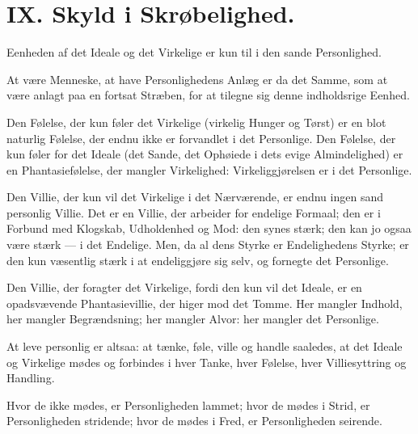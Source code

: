 \documentclass[12pt,a4paper]{book}
\newcommand{\apage}[1]{\marginnote{\footnotesize\textit{[#1]}}}
\begin{document}

\chapter*{IX. Skyld i Skrøbelighed.}
 \apage{93}
\label{ch:forel9}

Eenheden af det Ideale og det Virkelige er kun til i den sande Personlighed.

At være Menneske, at have Personlighedens Anlæg er da det Samme, som at være
anlagt paa en fortsat Stræben, for at tilegne sig denne indholdsrige Eenhed.

Den Følelse, der kun føler det Virkelige (virkelig Hunger og Tørst) er en
blot naturlig Følelse, der endnu ikke er forvandlet i det Personlige. Den
Følelse, der kun føler for det Ideale (det Sande, det Ophøiede i dets evige
Almindelighed) er en Phantasiefølelse, der mangler Virkelighed:
Virkeliggjørelsen er i det Personlige.

Den Villie, der kun vil det Virkelige i det Nærværende, er endnu ingen sand
personlig Villie. Det er en Villie, der arbeider for endelige Formaal; den
er i Forbund med Klogskab, Udholdenhed og Mod: den synes stærk; den kan jo
ogsaa være stærk --- i det Endelige. Men, da al dens Styrke er
Endelighedens Styrke; er den kun væsentlig stærk i at endeliggjøre sig
selv, og fornegte det Personlige.

Den Villie, der foragter det Virkelige, fordi den kun vil det Ideale, er en
opadsvævende Phantasievillie, der higer mod det Tomme. Her mangler
Indhold, her mangler Begrændsning; her mangler Alvor: her mangler det
Personlige.

At leve personlig er altsaa: at tænke, føle, ville og handle saaledes, at
det Ideale og Virkelige mødes og forbindes i hver Tanke, hver Følelse, hver
Villiesyttring og Handling.

\apage{94} Hvor de ikke mødes, er Personligheden lammet; hvor de mødes i Strid, er
Personligheden stridende; hvor de mødes i Fred, er Personligheden seirende.
\end{document}
